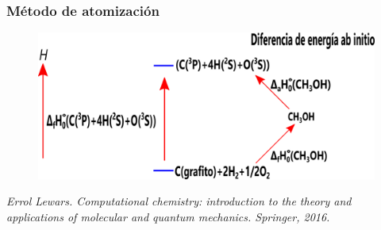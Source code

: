 \documentclass{beamer}
\begin{document}
\begin{frame}[fragile]
\frametitle{Método de atomización}
\begin{figure}
\includegraphics[scale=.65]{images/atomization-CH3OH}
\end{figure}
\tiny{\textit{Errol Lewars. Computational chemistry: introduction to the theory and applications of molecular and quantum mechanics. Springer, 2016.}}

\end{frame}
\end{document}
